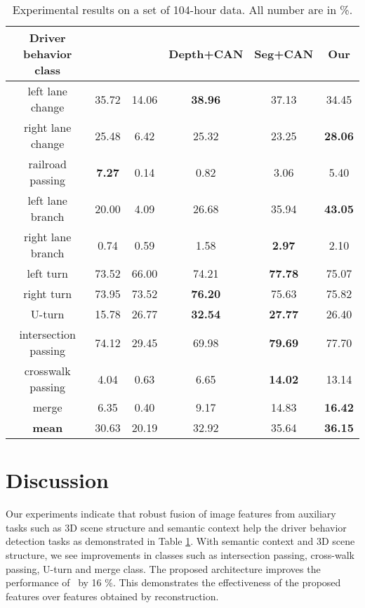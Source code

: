 \documentclass[10pt,twocolumn,letterpaper]{article}
\begin{document}
\begin{table}
\small
\caption{Experimental results on a set of 104-hour data. All number are in \%.} %
\centering %
  \begin{adjustbox}{max width=8cm}
\begin{tabular}{c c c c c c} %
\hline\hline %
Driver behavior class  &\cite{RamanishkaCVPR2018} & \cite{santana2016learning} & Depth+CAN & Seg+CAN & Our  \\ [0.5ex] %
\hline %
left lane change & 35.72 & 14.06& \textbf{38.96} &37.13&34.45  \\ 
right lane change & 25.48 & 6.42&25.32 &23.25&\bf{28.06} \\
railroad passing & \textbf{7.27} & 0.14& 0.82 &3.06&5.40  \\
left lane branch & 20.00 & 4.09 & 26.68 &35.94&\bf{43.05} \\
right lane branch & 0.74 & 0.59 &{1.58} &\bf{2.97}& {2.10} \\
left turn & 73.52 & 66.00&{74.21} &\bf{77.78}& 75.07 \\
right turn & 73.95 & 73.52 &\bf{76.20} &75.63&75.82 \\
U-turn & 15.78 & 26.77 &\bf{32.54} &\bf{27.77}&{26.40} \\
intersection passing & 74.12 & 29.45 &69.98 &\bf{79.69} &{77.70} \\
crosswalk passing & 4.04 & 0.63 &6.65 &\bf{14.02}&{13.14} \\
merge  & 6.35 & 0.40 &9.17 &14.83&\bf{16.42} \\[1ex] %
\hline
\textbf{mean} & 30.63 & 20.19 &32.92 &35.64&\textbf{36.15} \\[0.5ex]

\hline %
\end{tabular}
\end{adjustbox}
\label{table:results} %
\end{table}

\section{Discussion}
Our experiments indicate that robust fusion of image features from auxiliary tasks such as 3D scene structure and semantic context help the driver behavior detection tasks as demonstrated in Table \ref{table:results}. With  semantic context and 3D scene structure, we see improvements in classes such as intersection passing, cross-walk passing, U-turn and merge class. The proposed architecture improves the performance of~\cite{santana2016learning} by 16 \%. This demonstrates the effectiveness of the proposed features over features obtained by reconstruction. 
\end{document}
